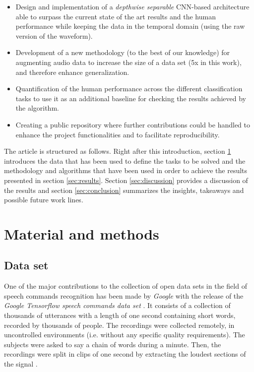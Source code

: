  \begin{itemize}
 	\item Design and implementation of a \textit{depthwise separable} CNN-based architecture able to surpass the current state of the art results and the human performance while keeping the data in the temporal domain (using the raw version of the waveform).

 	\item Development of a new methodology (to the best of our knowledge) for augmenting audio data to increase the size of a data set (5x in this work), and therefore enhance generalization.

 	\item Quantification of the human performance across the different classification tasks to use it as an additional baseline for checking the results achieved by the algorithm.

	\item Creating a public repository where further contributions could be handled to enhance the project functionalities and to facilitate reproducibility.
 \end{itemize}

 The article is structured as follows. Right after this introduction, section \ref{sec:MM} introduces the data that has been used to define the tasks to be solved and the methodology and algorithms that have been used in order to achieve the results presented in section \ref{sec:results}. Section \ref{sec:discussion} provides a discussion of the results and section \ref{sec:conclusion} summarizes the insights, takeaways and possible future work lines.

 \section{Material and methods} \label{sec:MM}

\subsection{Data set}
One of the major contributions to the collection of open data sets in the field of speech commands recognition has been made by \textit{Google} with the release of the \textit{Google Tensorflow speech commands data set} \cite{speechcommands, Warden2018}. It consists of a collection of thousands of utterances with a length of one second containing short words, recorded by thousands of people. The recordings were collected remotely, in uncontrolled environments (i.e. without any specific quality requirements). The subjects were asked to say a chain of words during a minute. Then, the recordings were split in clips of one second by extracting the loudest sections of the signal \cite{speechcommands, Warden2018}.

